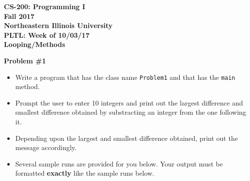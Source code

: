 \documentclass[12pt]{article}
\begin{document}
\begin{center}
	\textbf{CS-200: Programming I}\\
	\textbf{Fall 2017}\\
	\textbf{Northeastern Illinois University}\\
	\textbf{PLTL: Week of 10/03/17}\\
	\textbf{Looping/Methods}
\end{center}

\noindent\textbf{Problem \#1}
\begin{itemize}
	\item Write a program that has the class name \texttt{Problem1} and that has the \texttt{main} method.
	\item Prompt the user to enter 10 integers and print out the largest difference and smallest difference obtained by substracting an integer from the one following it.
	\item Depending upon the largest and smallest difference obtained, print out the message accordingly.
	\item Several sample runs are provided for you below. Your output must be formatted \textbf{exactly} like the sample runs below. 
\end{itemize}
\end{document}
